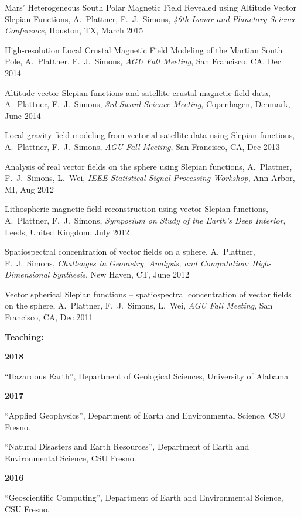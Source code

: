 \documentclass[10pt]{article}
\begin{document}
\spcp
Mars' Heterogeneous South Polar Magnetic Field Revealed using Altitude Vector Slepian Functions,
A.~Plattner,  F.~J.~Simons,
\emph{46th Lunar and Planetary Science Conference}, Houston, TX, March 2015

\spcp
High-resolution Local Crustal Magnetic Field Modeling of the Martian South Pole,
A.~Plattner,  F.~J.~Simons,
\emph{AGU Fall Meeting}, San Francisco, CA, Dec 2014

\spcp
Altitude vector Slepian functions and satellite crustal magnetic field data,
A.~Plattner,  F.~J.~Simons,
\emph{3rd Sward Science Meeting}, Copenhagen, Denmark, June 2014

\spcp
Local gravity field modeling from vectorial satellite data using Slepian functions,
A.~Plattner,  F.~J.~Simons,
\emph{AGU Fall Meeting}, San Francisco, CA, Dec 2013

\spcp
Analysis of real vector fields on the sphere using Slepian functions,
A.~Plattner, F.~J.~Simons, L.~Wei,
\emph{IEEE Statistical Signal Processing Workshop}, Ann Arbor, MI, Aug 2012

\spcp
Lithospheric magnetic field reconstruction using vector Slepian functions,
A.~Plattner, F.~J.~Simons,
\emph{Symposium on Study of the Earth's Deep Interior}, Leeds, United Kingdom, July 2012

\spcp
Spatiospectral concentration of vector fields on a sphere,
A.~Plattner, F.~J.~Simons,
\emph{Challenges in Geometry, Analysis, and Computation: High-Dimensional Synthesis}, 
New Haven, CT, June 2012

\spcp
Vector spherical Slepian functions -- spatiospectral concentration of vector fields on the sphere,
A.~Plattner, F.~J.~Simons, L.~Wei,
\emph{AGU Fall Meeting}, San Francisco, CA, Dec 2011




\spc
\textbf{\tsize Teaching:}


\spcp
\textbf{2018}

``Hazardous Earth'', Department of Geological Sciences, University of Alabama

\spcp
\textbf{2017}

``Applied Geophysics'', Department of Earth and Environmental Science, CSU Fresno.

\spcp
``Natural Disasters and Earth Resources'', Department of Earth and Environmental Science, CSU Fresno.

\spcp
\textbf{2016}

``Geoscientific Computing'', Department of Earth and Environmental Science, CSU Fresno.
\end{document}
